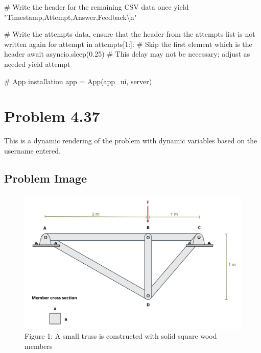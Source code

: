 \documentclass[
  letterpaper,
  DIV=11,
  numbers=noendperiod]{scrreprt}
\newenvironment{Shaded}{\begin{snugshade}}{\end{snugshade}}
\newcommand{\NormalTok}[1]{\textcolor[rgb]{0.00,0.23,0.31}{#1}}
\begin{document}
\begin{Shaded}
\begin{Highlighting}[]
\NormalTok{        \# Write the header for the remaining CSV data once}
\NormalTok{        yield "Timestamp,Attempt,Answer,Feedback\textbackslash{}n"}
        
\NormalTok{        \# Write the attempts data, ensure that the header from the attempts list is not written again}
\NormalTok{        for attempt in attempts[1:]:  \# Skip the first element which is the header}
\NormalTok{            await asyncio.sleep(0.25)  \# This delay may not be necessary; adjust as needed}
\NormalTok{            yield attempt}


\NormalTok{\# App installation}
\NormalTok{app = App(app\_ui, server)}
\end{Highlighting}
\end{Shaded}

\chapter*{Problem 4.37}\label{problem-4.37}


This is a dynamic rendering of the problem with dynamic variables based
on the username entered.

\section*{Problem Image}\label{problem-image-7}


\begin{figure}[H]

{\centering \includegraphics{images/157.png}

}

\caption{Figure 1: A small truss is constructed with solid square wood
members}

\end{figure}%
\end{document}
